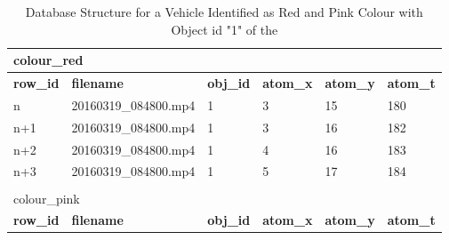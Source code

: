 \begin{table}[!hbt]
	\centering
  \caption{Database Structure for a Vehicle Identified as Red and Pink Colour
  with Object id "1" of the \versionOneRet }
  \label{table:dbSample}
  \begin{tabular}{llllll}
  \multicolumn{6}{l}{{ colour\_red}} \\ \hline
  \multicolumn{1}{|l|}{\textbf{row\_id}} & \multicolumn{1}{l|}{\textbf{filename}}    & \multicolumn{1}{l|}{\textbf{obj\_id}} & \multicolumn{1}{l|}{\textbf{atom\_x}} & \multicolumn{1}{l|}{\textbf{atom\_y}} & \multicolumn{1}{l|}{\textbf{atom\_t}} \\ \hline
  \multicolumn{1}{|l|}{n}                & \multicolumn{1}{l|}{20160319\_084800.mp4} & \multicolumn{1}{l|}{1}                & \multicolumn{1}{l|}{3}                & \multicolumn{1}{l|}{15}               & \multicolumn{1}{l|}{180}              \\ \hline
  \multicolumn{1}{|l|}{n+1}              & \multicolumn{1}{l|}{20160319\_084800.mp4} & \multicolumn{1}{l|}{1}                & \multicolumn{1}{l|}{3}                & \multicolumn{1}{l|}{16}               & \multicolumn{1}{l|}{182}              \\ \hline
  \multicolumn{1}{|l|}{n+2}              & \multicolumn{1}{l|}{20160319\_084800.mp4} & \multicolumn{1}{l|}{1}                & \multicolumn{1}{l|}{4}                & \multicolumn{1}{l|}{16}               & \multicolumn{1}{l|}{183}              \\ \hline
  \multicolumn{1}{|l|}{n+3}              & \multicolumn{1}{l|}{20160319\_084800.mp4} & \multicolumn{1}{l|}{1}                & \multicolumn{1}{l|}{5}                & \multicolumn{1}{l|}{17}               & \multicolumn{1}{l|}{184}              \\ \hline
                                         &                                           &                                       &                                       &                                       &                                       \\
  \multicolumn{6}{l}{{ colour\_pink}}                                                                                                                                                                                                              \\ \hline
  \multicolumn{1}{|l|}{\textbf{row\_id}} & \multicolumn{1}{l|}{\textbf{filename}}    & \multicolumn{1}{l|}{\textbf{obj\_id}} & \multicolumn{1}{l|}{\textbf{atom\_x}} & \multicolumn{1}{l|}{\textbf{atom\_y}} & \multicolumn{1}{l|}{\textbf{atom\_t}} \\ \hline

\end{tabular}
\end{table}
